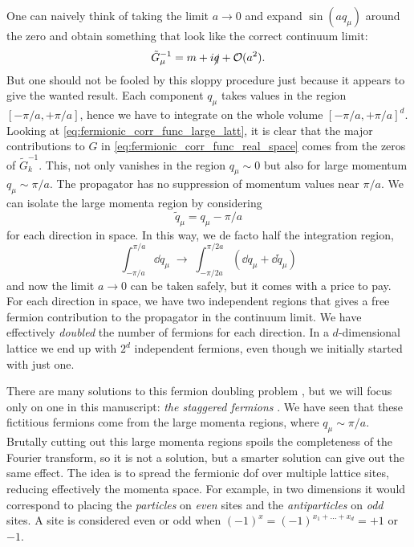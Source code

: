 One can naively think of taking the limit $a \to 0$ and expand $\sin(a q_{\mu})$ around the zero and obtain something that look like the correct continuum limit:
\begin{equation}
    \tilde{G}_{\mu}^{-1} = m + i \slashed{q} + \mathcal{O}(a^2).
\end{equation}
But one should not be fooled by this sloppy procedure just because it appears to give the wanted result.
Each component $q_{\mu}$ takes values in the region $[-\pi/a, +\pi/a]$, hence we have to integrate on the whole volume $[-\pi/a, +\pi/a]^d$.
Looking at \eqref{eq:fermionic_corr_func_large_latt}, it is clear that the major contributions to $G$ in \eqref{eq:fermionic_corr_func_real_space} comes from the zeros of $\tilde{G}_k^{-1}$.
This, not only vanishes in the region $q_{\mu} \sim 0$ but also for large momentum $q_{\mu} \sim \pi/a$.
The propagator has no suppression of momentum values near $\pi/a$.
We can isolate the large momenta region by considering
\begin{equation}
    \tilde{q}_{\mu} = q_{\mu} - \pi/a
\end{equation}
for each direction in space.
In this way, we de facto half the integration region,
\begin{equation}
    \int_{-\pi/a}^{\pi/a} \dd q_{\mu} \;\to\;
    \int_{-\pi/2a}^{\pi/2a} (\dd q_{\mu} + \dd \tilde{q}_{\mu})
\end{equation}
and now the limit $a \to 0$ can be taken safely, but it comes with a price to pay.
For each direction in space, we have two independent regions that gives a free fermion contribution to the propagator in the continuum limit.
We have effectively \emph{doubled} the number of fermions for each direction.
In a $d$-dimensional lattice we end up with $2^d$ independent fermions, even though we initially started with just one.

There are many solutions to this fermion doubling problem \cite{susskind1977fermions, tong2018gauge}, but we will focus only on one in this manuscript: \emph{the staggered fermions} \cite{kogut1975hamiltonian}.
We have seen that these fictitious fermions come from the large momenta regions, where $q_{\mu} \sim \pi/a$.
Brutally cutting out this large momenta regions spoils the completeness of the Fourier transform, so it is not a solution, but a smarter solution can give out the same effect.
The idea is to spread the fermionic \ac{dof} over multiple lattice sites, reducing effectively the momenta space.
For example, in two dimensions it would correspond to placing the \emph{particles} on \emph{even} sites and the \emph{antiparticles} on \emph{odd} sites.
A site is considered even or odd when $(-1)^x = (-1)^{x_1 + \dots + x_d} = +1$ or $-1$.

